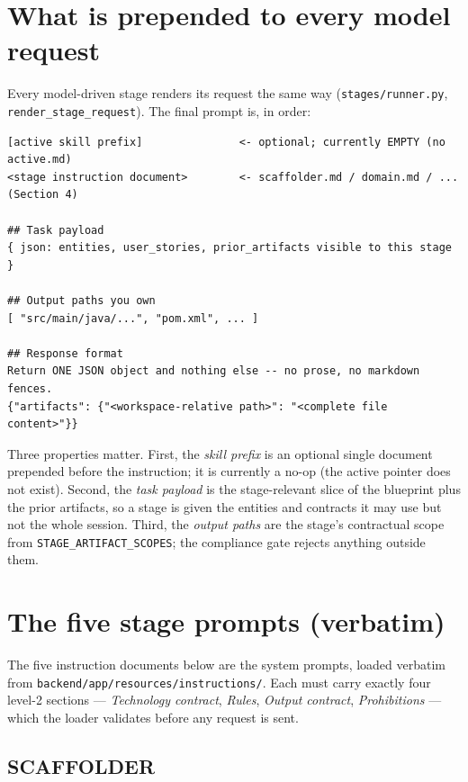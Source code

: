 \documentclass[11pt,a4paper]{article}
\begin{document}
\section{What is prepended to every model request}

Every model-driven stage renders its request the same way
(\texttt{stages/runner.py}, \texttt{render\_stage\_request}). The final prompt is, in
order:

\begin{lstlisting}
[active skill prefix]               <- optional; currently EMPTY (no active.md)
<stage instruction document>        <- scaffolder.md / domain.md / ... (Section 4)

## Task payload
{ json: entities, user_stories, prior_artifacts visible to this stage }

## Output paths you own
[ "src/main/java/...", "pom.xml", ... ]

## Response format
Return ONE JSON object and nothing else -- no prose, no markdown fences.
{"artifacts": {"<workspace-relative path>": "<complete file content>"}}
\end{lstlisting}

Three properties matter. First, the \emph{skill prefix} is an optional single
document prepended before the instruction; it is currently a no-op (the active
pointer does not exist). Second, the \emph{task payload} is the stage-relevant slice
of the blueprint plus the prior artifacts, so a stage is given the entities and
contracts it may use but not the whole session. Third, the \emph{output paths} are
the stage's contractual scope from \texttt{STAGE\_ARTIFACT\_SCOPES}; the compliance
gate rejects anything outside them.

\section{The five stage prompts (verbatim)}

The five instruction documents below are the system prompts, loaded verbatim from
\texttt{backend/app/resources/instructions/}. Each must carry exactly four level-2
sections --- \emph{Technology contract}, \emph{Rules}, \emph{Output contract},
\emph{Prohibitions} --- which the loader validates before any request is sent.

\subsection{SCAFFOLDER}
\end{document}
